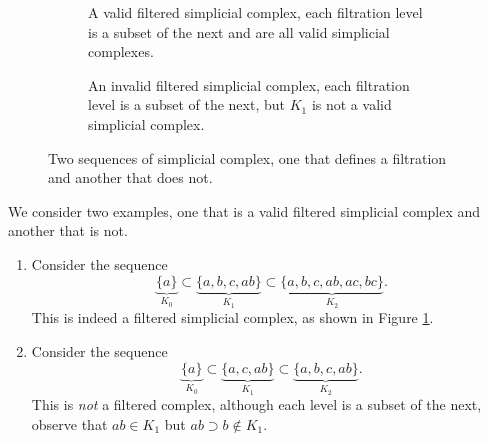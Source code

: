 \begin{figure}[b]
    \centering
    \begin{subfigure}[t]{0.49\textwidth}
        \centering
        \caption{A valid filtered simplicial complex, each filtration level is a subset of the next and are all valid simplicial complexes.}
        \label{fig:filtration-ex-1}
    \end{subfigure}
    \begin{subfigure}[t]{0.49\textwidth}
        \centering
        \caption{An invalid filtered simplicial complex, each filtration level is a subset of the next, but $K_1$ is not a valid simplicial complex.}
        \label{fig:filtration-ex-2}
    \end{subfigure}
    \caption{Two sequences of simplicial complex, one that defines a filtration and another that does not.}
\end{figure}

\begin{example}
    We consider two examples, one that is a valid filtered simplicial complex and another that is not. 
    \begin{enumerate}
        \item Consider the sequence
              \[ \underbrace{\{a\}}_{K_0} \subset \underbrace{\{a, b, c, ab\}}_{K_1} \subset \underbrace{\{a, b, c, ab, ac, bc\}}_{K_2}. \]
              This is indeed a filtered simplicial complex, as shown in Figure \ref{fig:filtration-ex-1}.
        \item Consider the sequence
              \[ \underbrace{\{a\}}_{K_0} \subset \underbrace{\{a, c, ab\}}_{K_1} \subset \underbrace{\{a, b, c, ab\}}_{K_2}. \]
              This is \emph{not} a filtered complex, although each level is a subset of the next, observe that $ab \in K_1$ but $ab \supset b \not\in K_1$.
    \end{enumerate}
\end{example}

